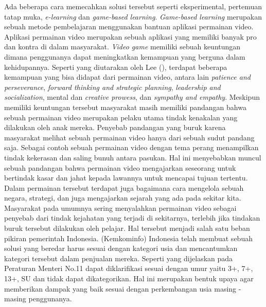 \linebreak\linebreak
Ada beberapa cara memecahkan solusi tersebut seperti eksperimental, pertemuan tatap muka, \textit{e-learning} dan \textit{game-based learning}. \textit{Game-based learning} merupakan sebuah metode pembelajaran menggunakan bantuan aplikasi permainan video. Aplikasi permainan video merupakan sebuah aplikasi yang memiliki banyak pro dan kontra di dalam masyarakat. \textit{Video game} memiliki sebuah keuntungan dimana penggunanya dapat meningkatkan kemampuan yang berguna dalam kehidupannya. Seperti yang diutarakan oleh Lee (\citeyear{paper.lee}), terdapat beberapa kemampuan yang bisa didapat dari permainan video, antara lain \textit{patience and perseverance}, \textit{forward thinking and strategic planning}, \textit{leadership and socialization}, mental dan \textit{creative prowess}, dan \textit{sympathy and empathy}. Meskipun memiliki keuntungan tersebut masyarakat masih memiliki pandangan bahwa sebuah permainan video merupakan pelaku utama tindak kenakalan yang dilakukan oleh anak mereka.
\linebreak\linebreak
Penyebab pandangan yang buruk karena masyarakat melihat sebuah permainan video hanya dari sebuah sudut pandang saja. Sebagai contoh sebuah permainan video dengan tema perang menampilkan tindak kekerasan dan saling bunuh antara pasukan. Hal ini menyebabkan muncul sebuah pandangan bahwa permainan video mengajarkan seseorang untuk bertindak kasar dan jahat kepada lawannya untuk mencapai tujuan tertentu. Dalam permainan tersebut terdapat juga bagaimana cara mengelola sebuah negara, strategi, dan juga mengajarkan sejarah yang ada pada sekitar kita. Masyarakat pada umumnya sering menyalahkan permainan video sebagai penyebab dari tindak kejahatan yang terjadi di sekitarnya, terlebih jika tindakan buruk tersebut dilakukan oleh pelajar.
\linebreak\linebreak
Hal tersebut menjadi salah satu beban pikiran pemerintah Indonesia. \kemkominfo (Kemkominfo) Indonesia telah membuat sebuah solusi \game yang beredar harus sesuai dengan kategori usia dan mencantumkan kategori tersebut dalam penjualan \game mereka. Seperti yang dijelaskan pada Peraturan Menteri No.11 \game dapat diklarifikasi sesuai dengan umur yaitu 3+, 7+, 13+, SU dan tidak dapat dikategorikan. Hal ini merupakan bentuk upaya agar \game memberikan dampak yang baik sesuai dengan perkembangan usia masing - masing penggunanya.
\linebreak\linebreak
